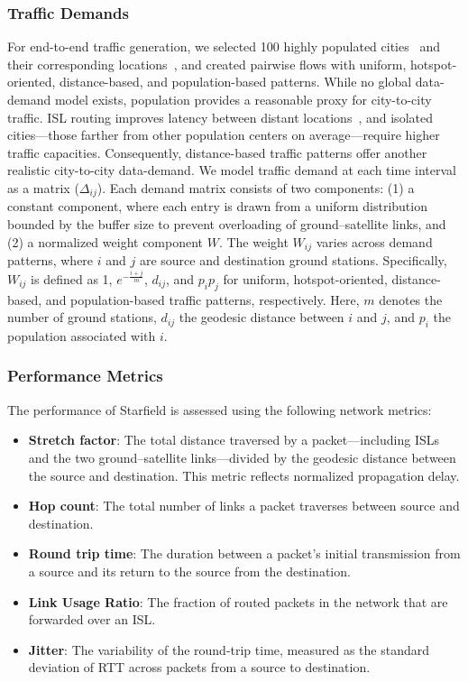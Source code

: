 \documentclass[acmsmall, screen]{acmart}
\begin{document}
\subsubsection{Traffic Demands}\label{evaluation:setup:demands}
For end-to-end traffic generation, we selected 100 highly populated cities~\cite{CityPopulation} and their corresponding locations~\cite{CityLocation}, and created pairwise flows with uniform, hotspot-oriented, distance-based, and population-based patterns. While no global data-demand model exists, population provides a reasonable proxy for city-to-city traffic. ISL routing improves latency between distant locations~\cite{chaudhry2020free}, and isolated cities—those farther from other population centers on average—require higher traffic capacities. Consequently, distance-based traffic patterns offer another realistic city-to-city data-demand. We model traffic demand at each time interval as a matrix ($\Delta_{ij}$). Each demand matrix consists of two components: (1) a constant component, where each entry is drawn from a uniform distribution bounded by the buffer size to prevent overloading of ground–satellite links, and (2) a normalized weight component $W$. The weight $W_{ij}$ varies across demand patterns, where $i$ and $j$ are source and destination ground stations. Specifically, $W_{ij}$ is defined as 1, $e^{-\frac{i+j}{m}}$, $d_{ij}$, and $p_ip_j$ for uniform, hotspot-oriented, distance-based, and population-based traffic patterns, respectively. Here, $m$ denotes the number of ground stations, $d_{ij}$ the geodesic distance between $i$ and $j$, and $p_i$ the population associated with $i$.

\subsubsection{Performance Metrics}\label{evaluation:setup:metrics}
The performance of Starfield is assessed using the following network metrics:
\begin{itemize}
    \item \textbf{Stretch factor}: The total distance traversed by a packet—including ISLs and the two ground–satellite links—divided by the geodesic distance between the source and destination. This metric reflects normalized propagation delay.
    \item \textbf{Hop count}: The total number of links a packet traverses between source and destination.
    \item \textbf{Round trip time}: The duration between a packet’s initial transmission from a source and its return to the source from the destination.
    \item \textbf{Link Usage Ratio}: The fraction of routed packets in the network that are forwarded over an ISL.
    \item \textbf{Jitter}: The variability of the round-trip time, measured as the standard deviation of RTT across packets from a source to destination.
\end{itemize}
\end{document}
